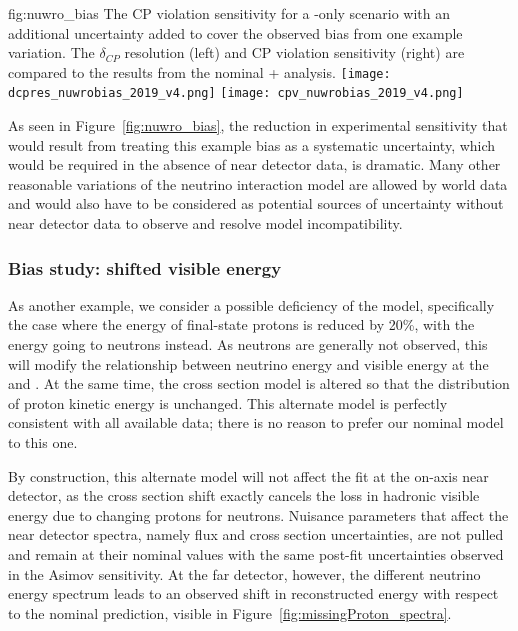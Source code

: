 \begin{dunefigure}{fig:nuwro_bias}
{The CP violation sensitivity for a -only scenario with an additional uncertainty added to cover the observed bias from one example variation. The $\delta_{CP}$ resolution (left) and CP violation sensitivity (right) are compared to the results from the nominal + analysis.}
  \texttt{[image: dcpres\_nuwrobias\_2019\_v4.png]}
  \texttt{[image: cpv\_nuwrobias\_2019\_v4.png]}
\end{dunefigure}

As seen in Figure~\ref{fig:nuwro_bias}, the reduction in experimental sensitivity that would result from treating this example bias as a systematic uncertainty, which would be required in the absence of near detector data, is dramatic. Many other reasonable variations of the neutrino interaction model are allowed by world data and would also have to be considered as potential sources of uncertainty without near detector data to observe and resolve model incompatibility. 

\subsubsection{Bias study: shifted visible energy}
\label{sec:missingProtonMD}

As another example, we consider a possible deficiency of the  model, specifically the case where the energy of final-state protons is reduced by 20\%, with the energy going to neutrons instead. As neutrons are generally not observed, this will modify the relationship between neutrino energy and visible energy at the  and . At the same time, the cross section model is altered so that the distribution of proton kinetic energy is unchanged. This alternate model is perfectly consistent with all available data; there is no reason to prefer our nominal  model to this one.

By construction, this alternate model will not affect the fit at the on-axis near detector, as the cross section shift exactly cancels the loss in hadronic visible energy due to changing protons for neutrons. Nuisance parameters that affect the near detector spectra, namely flux and cross section uncertainties, are not pulled and remain at their nominal values with the same post-fit uncertainties observed in the Asimov sensitivity. At the far detector, however, the different neutrino energy spectrum leads to an observed shift in reconstructed energy with respect to the nominal prediction, visible in Figure~\ref{fig:missingProton_spectra}.

